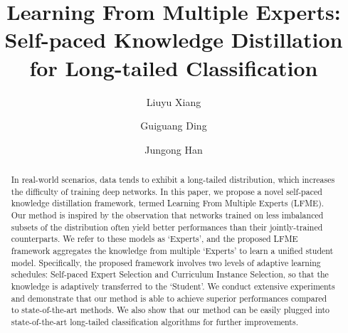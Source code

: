 \documentclass[runningheads]{llncs}
\begin{document}
\pagestyle{headings}
	\mainmatter
	\def\ECCVSubNumber{3119}  

	\title{Learning From Multiple Experts: Self-paced Knowledge Distillation for Long-tailed Classification} 

\begin{comment}
	\titlerunning{ECCV-20 submission ID \ECCVSubNumber} 
	\authorrunning{ECCV-20 submission ID \ECCVSubNumber} 
	\author{Anonymous ECCV submission}
	\institute{Paper ID \ECCVSubNumber}
	\end{comment}


\author{Liuyu Xiang   \and
		Guiguang Ding    \and
		Jungong Han }
\maketitle
	
	


	\begin{abstract}
		In real-world scenarios, data tends to exhibit a long-tailed distribution, which increases the difficulty of training deep networks. In this paper, we propose a novel self-paced knowledge distillation framework, termed Learning From Multiple Experts (LFME). Our method is inspired by the observation that networks trained on less imbalanced subsets of the distribution often yield better performances than their jointly-trained counterparts. We refer to these models as `Experts’, and the proposed LFME framework aggregates the knowledge from multiple `Experts' to learn a unified student model. Specifically, the proposed framework involves two levels of adaptive learning schedules: Self-paced Expert Selection and Curriculum Instance Selection, so that the knowledge is adaptively transferred to the `Student'. We conduct extensive experiments and demonstrate that our method is able to achieve superior performances compared to state-of-the-art methods. We also show that our method can be easily plugged into state-of-the-art long-tailed classification algorithms for further improvements.
	\end{abstract}
	
\end{document}
